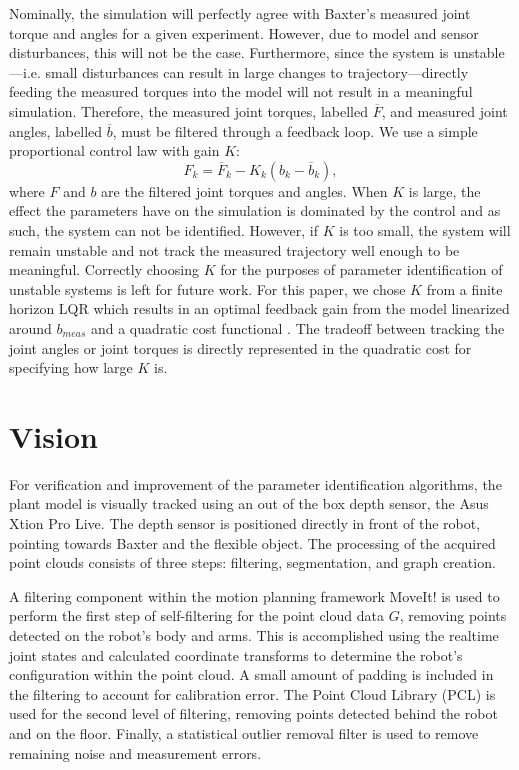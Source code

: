 \documentclass[runningheads,a4paper]{llncs}
\begin{document}
Nominally, the simulation will perfectly agree with Baxter's measured joint torque and angles for a given experiment. However, due to model and sensor disturbances, this will not be the case. Furthermore, since the system is unstable---i.e. small disturbances can result in large changes to trajectory---directly feeding the measured torques into the model will not result in a meaningful simulation. Therefore, the measured joint torques, labelled $\overline{F}$, and measured joint angles, labelled $\overline{b}$, must be filtered through a feedback loop. We use a simple proportional control law with gain $K$: 
\[
F_k = \overline{F}_k - K_k (b_k - \overline{b}_k),
\]
where $F$ and $b$ are the filtered joint torques and angles.  When $K$ is large, the effect the parameters have on the simulation is dominated by the control and as such, the system can not be identified. However, if $K$ is too small, the system will remain unstable and not track the measured trajectory well enough to be meaningful.  Correctly choosing $K$ for the purposes of parameter identification of unstable systems is left for future work.  For this paper, we chose $K$ from a finite horizon LQR which results in an optimal feedback gain from the model linearized around $b_{meas}$ and a quadratic cost functional \cite{anderson_moore}.  The tradeoff between tracking the joint angles or joint torques is directly represented in the quadratic cost for specifying how large $K$ is.


\section{Vision}
\label{sec-vis}
For verification and improvement of the parameter identification algorithms, the plant model is visually tracked using an out of the box depth sensor, the Asus Xtion Pro Live. The depth sensor is positioned directly in front of the robot, pointing towards Baxter and the flexible object. The processing of the acquired point clouds consists of three steps: filtering, segmentation, and graph creation. 

A filtering component within the motion planning framework MoveIt! \cite{coleman_etal_barrier} is used to perform the first step of self-filtering for the point cloud data $G$, removing points detected on the robot’s body and arms. This is accomplished using the realtime joint states and calculated coordinate transforms to determine the robot’s configuration within the point cloud. A small amount of padding is included in the filtering to account for calibration error. The Point Cloud Library (PCL) \cite{rusu20113d} is used for the second level of filtering, removing points detected behind the robot and on the floor. Finally, a statistical outlier removal filter is used to remove remaining noise and measurement errors.
\end{document}
